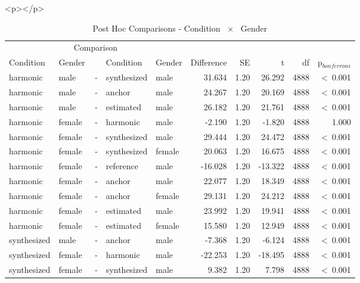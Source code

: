 \documentclass[a4paper,man,hidelinks,floatsintext]{apa7}
\begin{document}
        <p></p>
      
    
\begin{table}[!htbp]
\caption{Post Hoc Comparisons - Condition ~$\times$~ Gender}
\label{tab:Table_10}
\begin{adjustbox}{max size={\columnwidth}{\textheight}}
\centering
\begin{tabular}{llrllrrrrr}
\hline
\multicolumn{5}{c}{Comparison} & \multicolumn{5}{c}{~} \\
\cline{1-5}
Condition   & Gender & ~ & Condition   & Gender & Difference &   SE &       t &   df & p$_{bonferroni}$ \\
\hline
harmonic    & male   & - & synthesized & male   &     31.634 & 1.20 &  26.292 & 4888 &  \textless~0.001 \\
harmonic    & male   & - & anchor      & male   &     24.267 & 1.20 &  20.169 & 4888 &  \textless~0.001 \\
harmonic    & male   & - & estimated   & male   &     26.182 & 1.20 &  21.761 & 4888 &  \textless~0.001 \\
harmonic    & female & - & harmonic    & male   &     -2.190 & 1.20 &  -1.820 & 4888 &            1.000 \\
harmonic    & female & - & synthesized & male   &     29.444 & 1.20 &  24.472 & 4888 &  \textless~0.001 \\
harmonic    & female & - & synthesized & female &     20.063 & 1.20 &  16.675 & 4888 &  \textless~0.001 \\
harmonic    & female & - & reference   & male   &    -16.028 & 1.20 & -13.322 & 4888 &  \textless~0.001 \\
harmonic    & female & - & anchor      & male   &     22.077 & 1.20 &  18.349 & 4888 &  \textless~0.001 \\
harmonic    & female & - & anchor      & female &     29.131 & 1.20 &  24.212 & 4888 &  \textless~0.001 \\
harmonic    & female & - & estimated   & male   &     23.992 & 1.20 &  19.941 & 4888 &  \textless~0.001 \\
harmonic    & female & - & estimated   & female &     15.580 & 1.20 &  12.949 & 4888 &  \textless~0.001 \\
synthesized & male   & - & anchor      & male   &     -7.368 & 1.20 &  -6.124 & 4888 &  \textless~0.001 \\
synthesized & female & - & harmonic    & male   &    -22.253 & 1.20 & -18.495 & 4888 &  \textless~0.001 \\
synthesized & female & - & synthesized & male   &      9.382 & 1.20 &   7.798 & 4888 &  \textless~0.001 \\

\end{tabular}
\end{adjustbox}
\end{table}
\end{document}
